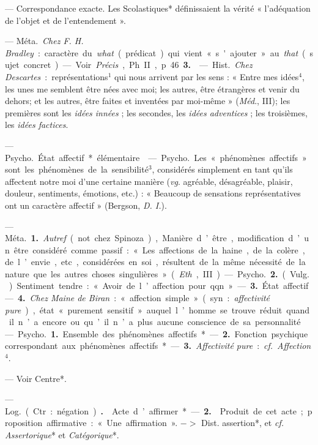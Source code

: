 \begin{itemize}[leftmargin=1cm, label=, itemsep=1pt]
 — Correspondance exacte.
Les Scolastiques* définissaient la
vérité « l'adéquation de l’objet et de
l'entendement ».

 — \si{Méta.} {\it Chez F. H. Bradley} :
caractère du {\it what} (prédicat) qui
vient «s'ajouter » au {\it that} (sujet concret). — Voir {\it Précis}, Ph. II, p. 46 {\bf 3.}

 — \si{Hist.} {\it Chez Descartes} : représentations$^1$ qui nous
arrivent par les sens : « Entre mes
idées$^4$, les unes me semblent être
nées avec moi; les autres, être étrangères et venir du dehors; et les
autres, être faites et inventées par
moi-même » ({\it Méd}., III); les premières sont les {\it idées innées} ; les
secondes, les {\it idées adventices} ; les
troisièmes, les {\it idées factices}.

 — \si{Psycho.} État affectif*
élémentaire.

 — \si{Psycho.} Les « phénomènes
affectifs » sont les phénomènes de la
sensibilité$^3$, considérés simplement
en tant qu'ils affectent notre moi
d’une certaine manière ({\it vg}. agréable,
désagréable, plaisir, douleur, sentiments, émotions, etc.) : « Beaucoup
de sensations représentatives ont un
caractère affectif » (Bergson, {\it D. I.}).

 — \si{Méta.} {\bf 1.} {\it Autref}. (not.
chez Spinoza), Manière d’être, modification d’un être considéré comme
passif : « Les affections de la haine,
de la colère, de l’envie, etc., considérées en soi, résultent de la même
nécessité de la nature que les autres
choses singulières » ({\it Eth}., III).

— \si{Psycho.} {\bf 2.} (\si{Vulg.}) Sentiment
tendre : « Avoir de l’affection pour
qqn ». — {\bf 3.} État affectif. — {\bf 4.} {\it Chez
Maine de Biran} : « affection simple »
(syn. : {\it affectivité pure}), état « purement sensitif » auquel l’homme se
trouve réduit quand il n’a encore ou
qu’il n’a plus aucune conscience de
sa personnalité.

 — \si{Psycho.} {\bf 1.} Ensemble
des phénomènes affectifs*. — {\bf 2.}
Fonction psychique correspondant
aux phénomènes affectifs*. — {\bf 3.}
{\it Affectivité pure} : {\it cf.}  {\it Affection}$^4$.

 — Voir Centre*.

 — \si{Log.} (Ctr. : négation).
 {\bf .}  Acte d’affirmer*. — {\bf 2.}  Produit de cet acte ;
proposition affirmative : « Une affirmation ».
$->$ Dist. assertion*, et {\it cf.}  {\it Assertorique}* et {\it Catégorique}*.


\end{itemize}
